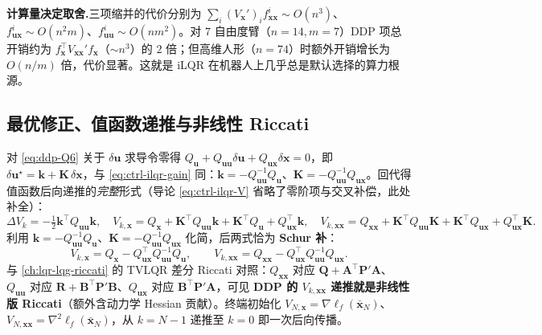 \begin{insight}
\textbf{计算量决定取舍.}\;三项缩并的代价分别为 $\sum_i(V_{\mathbf{x}}')_i f^i_{\mathbf{xx}}\sim O(n^3)$、$f^i_{\mathbf{ux}}\sim O(n^2m)$、$f^i_{\mathbf{uu}}\sim O(nm^2)$。对 $7$ 自由度臂（$n=14,m=7$）DDP 项总开销约为 $f_{\mathbf{x}}^\top V_{\mathbf{xx}}'f_{\mathbf{x}}$（$\sim n^3$）的 $2$ 倍；但高维人形（$n=74$）时额外开销增长为 $O(n/m)$ 倍，代价显著。这就是 iLQR 在机器人上几乎总是默认选择的算力根源。
\end{insight}

\subsection{最优修正、值函数递推与非线性 Riccati}
\label{sec:ddp-riccati}

对 \cref{eq:ddp-Q6} 关于 $\delta\mathbf{u}$ 求导令零得 $Q_{\mathbf{u}}+Q_{\mathbf{uu}}\delta\mathbf{u}+Q_{\mathbf{ux}}\delta\mathbf{x}=0$，即 $\delta\mathbf{u}^\star=\mathbf{k}+\mathbf{K}\,\delta\mathbf{x}$，与 \cref{eq:ctrl-ilqr-gain} 同：$\mathbf{k}=-Q_{\mathbf{uu}}^{-1}Q_{\mathbf{u}}$、$\mathbf{K}=-Q_{\mathbf{uu}}^{-1}Q_{\mathbf{ux}}$。回代得值函数后向递推的\emph{完整}形式（导论 \cref{eq:ctrl-ilqr-V} 省略了零阶项与交叉补偿，此处补全）：
\begin{equation}
  \Delta V_k=-\tfrac12\mathbf{k}^\top Q_{\mathbf{uu}}\mathbf{k},\quad
  V_{k,\mathbf{x}}=Q_{\mathbf{x}}+\mathbf{K}^\top Q_{\mathbf{uu}}\mathbf{k}+\mathbf{K}^\top Q_{\mathbf{u}}+Q_{\mathbf{ux}}^\top\mathbf{k},\quad
  V_{k,\mathbf{xx}}=Q_{\mathbf{xx}}+\mathbf{K}^\top Q_{\mathbf{uu}}\mathbf{K}+\mathbf{K}^\top Q_{\mathbf{ux}}+Q_{\mathbf{ux}}^\top\mathbf{K}.
  \label{eq:ddp-Vrec}
\end{equation}
利用 $\mathbf{k}=-Q_{\mathbf{uu}}^{-1}Q_{\mathbf{u}}$、$\mathbf{K}=-Q_{\mathbf{uu}}^{-1}Q_{\mathbf{ux}}$ 化简，后两式恰为 \textbf{Schur 补}：
\begin{equation}
  V_{k,\mathbf{x}}=Q_{\mathbf{x}}-Q_{\mathbf{ux}}^\top Q_{\mathbf{uu}}^{-1}Q_{\mathbf{u}},\qquad
  V_{k,\mathbf{xx}}=Q_{\mathbf{xx}}-Q_{\mathbf{ux}}^\top Q_{\mathbf{uu}}^{-1}Q_{\mathbf{ux}}.
  \label{eq:ddp-schur}
\end{equation}
与 \cref{ch:lqr-lqg-riccati} 的 TVLQR 差分 Riccati 对照：$Q_{\mathbf{xx}}$ 对应 $\mathbf{Q}+\mathbf{A}^\top\mathbf{P}'\mathbf{A}$、$Q_{\mathbf{uu}}$ 对应 $\mathbf{R}+\mathbf{B}^\top\mathbf{P}'\mathbf{B}$、$Q_{\mathbf{ux}}$ 对应 $\mathbf{B}^\top\mathbf{P}'\mathbf{A}$，可见 \textbf{DDP 的 $V_{k,\mathbf{xx}}$ 递推就是非线性版 Riccati}（额外含动力学 Hessian 贡献）。终端初始化 $V_{N,\mathbf{x}}=\nabla\ell_f(\bar{\mathbf{x}}_N)$、$V_{N,\mathbf{xx}}=\nabla^2\ell_f(\bar{\mathbf{x}}_N)$，从 $k=N-1$ 递推至 $k=0$ 即一次后向传播。

